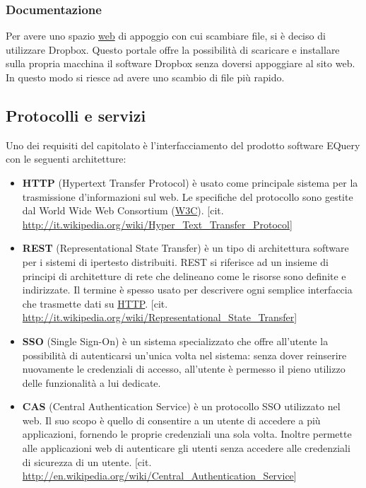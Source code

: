 \documentclass[a4paper,11pt]{article}
\begin{document}
\subsubsection{Documentazione}
Per avere uno spazio \underline{web} di appoggio con cui scambiare file, si \`e deciso di utilizzare Dropbox. Questo portale offre la possibilit\`a di scaricare e installare sulla propria macchina il software Dropbox senza doversi appoggiare al sito web. In questo modo si riesce ad avere uno scambio di file pi\`u rapido.
\subsection{Protocolli e servizi}
Uno dei requisiti del capitolato \`e l'interfacciamento del prodotto software EQuery con le seguenti architetture:
\begin{itemize}
\item \textbf{HTTP} (Hypertext Transfer Protocol) \`e usato come principale sistema per la trasmissione d'informazioni sul web. Le specifiche del protocollo sono gestite dal World Wide Web Consortium (\underline{W3C}). [cit. \url{http://it.wikipedia.org/wiki/Hyper_Text_Transfer_Protocol}]
\item \textbf{REST} (Representational State Transfer) \`e un tipo di architettura software per i sistemi di ipertesto distribuiti. REST si riferisce ad un insieme di principi di architetture di rete che delineano come le risorse sono definite e indirizzate. Il termine \`e spesso usato per descrivere ogni semplice interfaccia che trasmette dati su \underline{HTTP}. [cit. \url{http://it.wikipedia.org/wiki/Representational_State_Transfer}]
\item \textbf{SSO} (Single Sign-On) \`e un sistema specializzato che offre all'utente la possibilit\`a di autenticarsi un'unica volta nel sistema: senza dover reinserire nuovamente le credenziali di accesso, all'utente \`e permesso il pieno utilizzo delle funzionalit\`a a lui dedicate.
\item \textbf{CAS} (Central Authentication Service) \`e un protocollo SSO utilizzato nel web. Il suo scopo \`e quello di consentire a un utente di accedere a pi\`u applicazioni, fornendo le proprie credenziali una sola volta. Inoltre permette alle applicazioni web di autenticare gli utenti senza accedere alle credenziali di sicurezza di un utente. [cit. \url{http://en.wikipedia.org/wiki/Central_Authentication_Service}]
\end{itemize}
\end{document}
